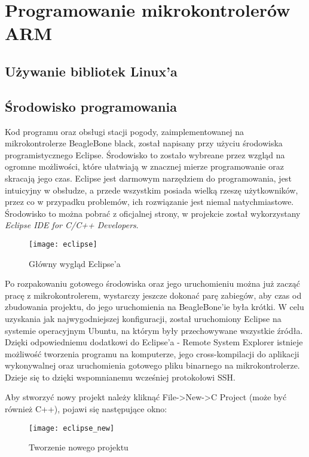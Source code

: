 \chapter{Programowanie mikrokontrolerów ARM}

\section{Używanie bibliotek Linux'a}

\section{Środowisko programowania}
Kod programu oraz obsługi stacji pogody, zaimplementowanej na mikrokontrolerze BeagleBone black, został napisany przy użyciu środowiska programistycznego Eclipse. Środowisko to zostało wybreane przez wzgląd na ogromne możliwości, które ułatwiają w znacznej mierze programowanie oraz skracają jego czas. Eclipse jest darmowym narzędziem do programowania, jest intuicyjny w obsłudze, a przede wszystkim posiada wielką rzeszę użytkowników, przez co w przypadku problemów, ich rozwiązanie jest niemal natychmiastowe. Środowisko to można pobrać z oficjalnej strony, w projekcie został wykorzystany \emph{Eclipse IDE for C/C++ Developers}.

\begin{figure}[h]
\centering
\texttt{[image: eclipse]}
\caption{Główny wygląd Eclipse'a}
\label{fig:eclipse}
\end{figure}

Po rozpakowaniu gotowego środowiska oraz jego uruchomieniu można już zacząć pracę z mikrokontrolerem, wystarczy jeszcze dokonać parę zabiegów, aby czas od zbudowania projektu, do jego uruchomienia na BeagleBone'ie była krótki. W celu uzyskania jak najwygodniejszej konfiguracji, został uruchomiony Eclipse na systemie operacyjnym Ubuntu, na którym były przechowywane wszystkie źródła. Dzięki odpowiedniemu dodatkowi do Eclipse'a - Remote System Explorer istnieje możliwość tworzenia programu na komputerze, jego cross-kompilacji do aplikacji wykonywalnej oraz uruchomienia gotowego pliku binarnego na mikrokontrolerze. Dzieje się to dzięki wspomnianemu wcześniej protokołowi SSH.

Aby stworzyć nowy projekt należy kliknąć File->New->C Project (może być również C++), pojawi się następujące okno:

\begin{figure}[h]
\centering
\texttt{[image: eclipse\_new]}
\caption{Tworzenie nowego projektu}
\label{fig:eclipse_new}
\end{figure}

